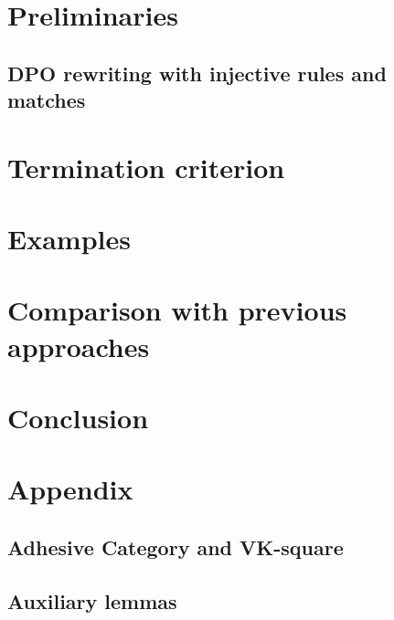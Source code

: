 \documentclass{report}
\begin{document}
\section{Preliminaries} 
\label{subgraph_counting:sec:pre} 
\subsection{DPO rewriting with injective rules and matches} 


 
  
\section{Termination criterion}
\label{subgraph_counting:sec:termination} 

 

\section{Examples} 
\label{subgraph_counting:sec:examples}


  
\section{Comparison with previous approaches}
\label{subgraph_counting:sec:related_work} 


\section{Conclusion}
\label{subgraph_counting:sec:conclusion} 


\newpage

\section{Appendix}
\label{subgraph_counting:sec:appendix}
\subsection*{Adhesive Category and VK-square}

\subsection*{Auxiliary lemmas}

\end{document}
